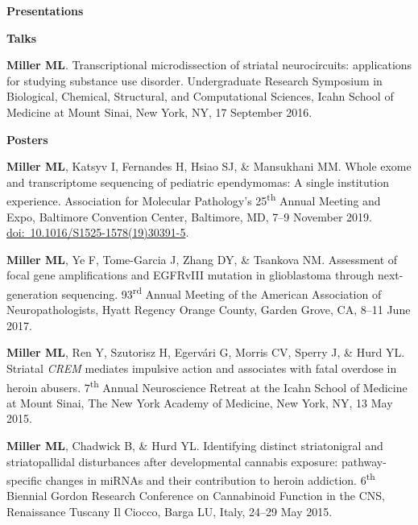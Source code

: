 \documentclass[10pt]{article}
\begin{document}
\vspace{0.1in}

{\large \textbf{Presentations}}
\begin{description}
\item \textbf{Talks}
\item[\quad] \textbf{Miller ML}. Transcriptional microdissection of striatal neurocircuits: applications for studying substance use disorder. Undergraduate Research Symposium in Biological, Chemical, Structural, and Computational Sciences, Icahn School of Medicine at Mount Sinai, New York, NY, 17 September 2016.
\end{description}

\begin{description}
\item \textbf{Posters}

\item[\quad] \textbf{Miller ML}, Katsyv I, Fernandes H, Hsiao SJ, \& Mansukhani MM. Whole exome and transcriptome sequencing of pediatric ependymomas: A single institution experience. Association for Molecular Pathology's 25\textsuperscript{th} Annual Meeting and Expo, Baltimore Convention Center, Baltimore, MD, 7--9 November 2019. \href{https://doi.org/10.1016/S1525-1578(19)30391-5}{doi:~10.1016/S1525-1578(19)30391-5}.

\item[\quad] \textbf{Miller ML}, Ye F, Tome-Garcia J, Zhang DY, \& Tsankova NM. Assessment of focal gene amplifications and EGFRvIII mutation in glioblastoma through next-generation sequencing. 93\textsuperscript{rd} Annual Meeting of the American Association of Neuropathologists, Hyatt Regency Orange County, Garden Grove, CA, 8--11 June 2017.

\item[\quad] \textbf{Miller ML}, Ren Y, Szutorisz H, Egervári G, Morris CV, Sperry J, \& Hurd YL. Striatal \textit{CREM} mediates impulsive action and associates with fatal overdose in heroin abusers. 7\textsuperscript{th} Annual Neuroscience Retreat at the Icahn School of Medicine at Mount Sinai, The New York Academy of Medicine, New York, NY, 13 May 2015.

\item[\quad] \textbf{Miller ML}, Chadwick B, \& Hurd YL. Identifying distinct striatonigral and striatopallidal disturbances after developmental cannabis exposure: pathway-specific changes in miRNAs and their contribution to heroin addiction. 6\textsuperscript{th} Biennial Gordon Research Conference on Cannabinoid Function in the CNS, Renaissance Tuscany Il Ciocco, Barga LU, Italy, 24--29 May 2015.


\end{description}
\end{document}
